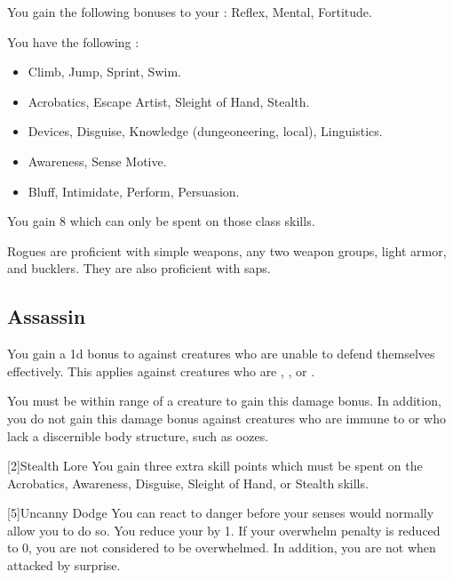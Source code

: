         You gain the following bonuses to your :  Reflex,  Mental,  Fortitude.

        You have the following :
        \begin{itemize}
            \item {} Climb, Jump, Sprint, Swim.
            \item {} Acrobatics, Escape Artist, Sleight of Hand, Stealth.
            \item {} Devices, Disguise, Knowledge (dungeoneering, local), Linguistics.
            \item {} Awareness, Sense Motive.
            \item {} Bluff, Intimidate, Perform, Persuasion.
        \end{itemize}
        You gain 8  which can only be spent on those class skills.

        Rogues are proficient with simple weapons, any two weapon groups, light armor, and bucklers.
        They are also proficient with saps.

    \subsection{Assassin}
         You gain a \plus1d bonus to  against creatures who are unable to defend themselves effectively.
        This applies against creatures who are \unaware, , or .

        You must be within \rngclose range of a creature to gain this damage bonus.
        In addition, you do not gain this damage bonus against creatures who are immune to  or who lack a discernible body structure, such as oozes.

        [2]{Stealth Lore} You gain three extra skill points which must be spent on the Acrobatics, Awareness, Disguise, Sleight of Hand, or Stealth skills.

        [5]{Uncanny Dodge} You can react to danger before your senses would normally allow you to do so.
        You reduce your  by 1.
        If your overwhelm penalty is reduced to 0, you are not considered to be overwhelmed.
        In addition, you are not \unaware when attacked by surprise.

